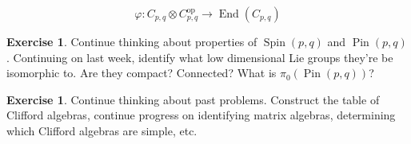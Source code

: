 \documentclass[psamsfonts]{amsart}
\theoremstyle{definition}
\newtheorem{exer}[thm]{Exercise}
\theoremstyle{remark}
\DeclareMathOperator{\End}{End}
\DeclareMathOperator{\Pin}{Pin}
\DeclareMathOperator{\Spin}{Spin}
\begin{document}
$$\varphi : C_{p,q} \otimes C_{p,q}^\text{op} \to \End(C_{p,q}) $$
%
\begin{exer}
Continue thinking about properties of $\Spin(p,q)$ and $\Pin(p,q)$. Continuing on last week, identify what low dimensional Lie groups they're be isomorphic to. Are they compact? Connected? What is $\pi_0(\Pin(p,q))$?
\end{exer}
%
\begin{exer}
Continue thinking about past problems. Construct the table of Clifford algebras, continue progress on identifying matrix algebras, determining which Clifford algebras are simple, etc.
\end{exer}
%
\end{document}

